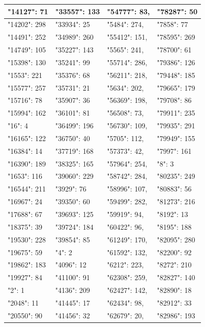 \documentclass[11pt,letterpaper]{article}
\begin{document}
\begin{enumerate}[label=\alph*)]
\begin{itemize}
\begin{table}[H]
\begin{longtable}{|l|l|l|l|}
"14127": 71 & "33557": 133 & "54777": 83, & "78287": 50 \\ \hline
"14202": 298 & "33934": 25 & "5484": 274, & "7858": 77 \\ \hline
"14491": 252 & "34989": 260 & "55412": 151, & "78595": 269 \\ \hline
"14749": 105 & "35227": 143 & "5565": 241, & "78700": 61 \\ \hline
"15398": 130 & "35241": 99 & "55714": 286, & "79386": 126 \\ \hline
"1553":  221 & "35376": 68 & "56211": 218, & "79448": 185 \\ \hline
"15577": 257 & "35731": 21 & "5634": 202, & "79665": 179 \\ \hline
"15716": 78 & "35907": 36 & "56369": 198, & "79708": 86 \\ \hline
"15994": 162 & "36101": 81 & "56508": 73, & "79911": 235 \\ \hline
"16":    4 & "36499": 196 & "56730": 109, & "79935": 291 \\ \hline
"16165": 122 & "36750": 40 & "5705": 112, & "79949": 155 \\ \hline
"16384": 14 & "37719": 168 & "57373": 42, & "7997": 161 \\ \hline
"16390": 189 & "38325": 165 & "57964": 254, & "8": 3 \\ \hline
"1653":  116 & "39060": 229 & "58742": 284, & "80235": 249 \\ \hline
"16544": 211 & "3929": 76 & "58996": 107, & "80883": 56 \\ \hline
"16967": 24 & "39350": 60 & "59499": 282, & "81273": 216 \\ \hline
"17688": 67 & "39693": 125 & "59919": 94, & "8192": 13 \\ \hline
"18375": 39 & "39724": 184 & "60422": 96, & "8195": 188 \\ \hline
"19530": 228 & "39854": 85 & "61249": 170, & "82095": 280 \\ \hline
"19675": 59 & "4": 2 & "61592": 132, & "82200": 92 \\ \hline
"19862": 183 & "4096": 12 & "6212": 223, & "8272": 210 \\ \hline
"19927": 84 & "41100": 91 & "62308": 259, & "82827": 140 \\ \hline
"2":     1 & "4136": 209 & "62427": 142, & "82890": 18 \\ \hline
"2048":  11 & "41445": 17 & "62434": 98, & "82912": 33 \\ \hline
"20550": 90 & "41456": 32 & "62679": 20, & "82986": 193 \\ \hline

\end{longtable}
\end{table}
\end{itemize}
\end{enumerate}
\end{document}
